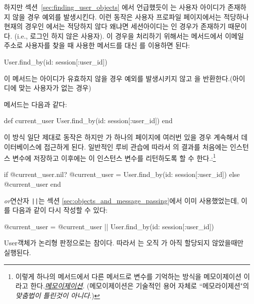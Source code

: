 \noindent 하지만 섹션~\ref{sec:finding_user_objects} 에서 언급했듯이  는 사용자 아이디가 존재하지 않을 경우 예외를 발생시킨다. 이런 동작은 사용자 프로파일 페이지에서는 적당하나 현재의 경우인 에서는 적당하지 않다 왜냐면 세션아이디는 인 경우가 존재하기 때문이다. (i.e., 로그인 하지 않은 사용자). 이 경우을 처리하기 위해서는  메서드에서 이메일 주소로 사용자를 찾을 때 사용한 메서드를  대신 를 이용하면 된다: 

\begin{code} User.find_by(id: session[:user_id]) \end{code} 

\noindent 이 메서드는 아이디가 유효하지 않을 경우 예외를 발생시키지 않고 을 반환한다.(아이디에 맞는 사용자가 없는 경우) 

 메서드는 다음과 같다: 

\begin{code} def current_user User.find_by(id: session[:user_id]) end \end{code} 

\noindent 이 방식 일단 제대로 동작은 하지만 가 하나의 페이지에 여러번 있을 경우 계속해서 데이터베이스에 접근하게 된다. 일반적인 루비 관습에 따라서 의 결과를 처음에는 인스턴스 변수에 저장하고 이후에는 이 인스턴스 변수를 리턴하도록 할 수 한다.:\footnote{이렇게 하나의 메서드에서 다른 메서드로 변수를 기억하는 방식을 메모이제이션 이라고 한다.\href{http://en.wikipedia.org/wiki/Memoization}{\emph{메모이제이션}}. (메모이제이션은 기술적인 용어 자체로 ``메모라이제션"의 \emph{맞춤법이 틀린것이 아니다}.)} 

\begin{code} if @current_user.nil? @current_user = User.find_by(id: session[:user_id]) else @current_user end \end{code} 

\noindent \emph{or}연산자 \texttt{||}는 섹션 \ref{sec:objects_and_message_passing}에서 이미 사용했었는데, 이를 다음과 같이 다시 작성할 수 있다: 

\begin{code} @current_user = @current_user || User.find_by(id: session[:user_id]) \end{code} 

\noindent User객체가 논리형 판정으로는 참이다. 따라서 는 오직 가 아직 할당되지 않았을때만 실행된다. 

